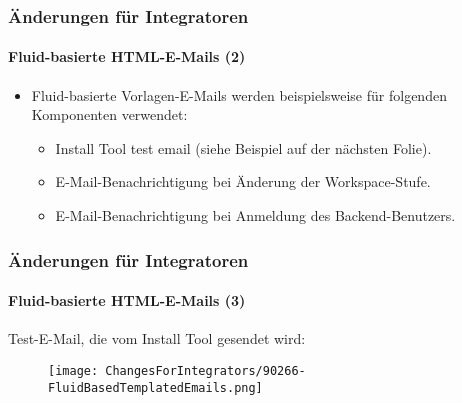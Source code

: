 
\begin{frame}[fragile]
	\frametitle{Änderungen für Integratoren}
	\framesubtitle{Fluid-basierte HTML-E-Mails (2)}

	\begin{itemize}
		\item Fluid-basierte Vorlagen-E-Mails werden beispielsweise für folgenden Komponenten verwendet:

			\begin{itemize}
				\item Install Tool test email (siehe Beispiel auf der nächsten Folie).
				\item E-Mail-Benachrichtigung bei Änderung der Workspace-Stufe.
				\item E-Mail-Benachrichtigung bei Anmeldung des Backend-Benutzers.
			\end{itemize}

	\end{itemize}

\end{frame}


\begin{frame}[fragile]
	\frametitle{Änderungen für Integratoren}
	\framesubtitle{Fluid-basierte HTML-E-Mails (3)}

	Test-E-Mail, die vom Install Tool gesendet wird:

	\begin{figure}
		\texttt{[image: ChangesForIntegrators/90266-FluidBasedTemplatedEmails.png]}
	\end{figure}

\end{frame}


